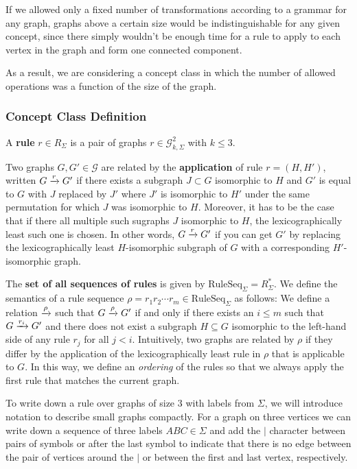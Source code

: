 \documentclass[]{article}
\def\RuleSeq{\mathrm{RuleSeq}\xspace}
\def\Graphs{\mathcal{G}\xspace}
\begin{document}
If we allowed only a fixed number of transformations according to a grammar for
any graph, graphs above a certain size would be indistinguishable for any given
concept, since there simply wouldn't be enough time for a rule to apply to each
vertex in the graph and form one connected component.

As a result, we are considering a concept class in which the number of allowed
operations was a function of the size of the graph.

\subsubsection{Concept Class Definition}

A \textbf{rule} $r \in R_{\Sigma}$ is a pair of graphs
$r \in \Graphs_{k,\Sigma}^2$ with $k \leq 3$.

Two graphs $G,G' \in \Graphs$ are related by the \textbf{application} of rule
$r = (H,H')$, written $G \xrightarrow{r} G'$ if there exists a subgraph $J \subset G$
isomorphic to $H$ and $G'$ is equal to $G$ with $J$ replaced by $J'$ where $J'$
is isomorphic to $H'$ under the same permutation for which $J$ was isomorphic to
$H$. Moreover, it has to be the case that if there all multiple such sugraphs
$J$ isomorphic to $H$, the lexicographically least such one is chosen.
In other words, $G \xrightarrow{r} G'$ if you can get $G'$ by replacing the
lexicographically least $H$-isomorphic subgraph of $G$ with a corresponding
$H'$-isomorphic graph.

The \textbf{set of all sequences of rules} is given by
$\RuleSeq_{\Sigma} = R_{\Sigma}^*$. We define the semantics of a rule sequence
$\rho = r_1r_2\dotsm r_m \in \RuleSeq_{\Sigma}$ as follows: We define a relation
$\xrightarrow{\rho}$ such that $G \xrightarrow{\rho} G'$ if and only if there exists an
$i\leq m$ such that $G\xrightarrow{r_i} G'$ and there does not exist a subgraph
$H \subseteq G$ isomorphic to the left-hand side of any rule $r_j$ for all
$j < i$. Intuitively, two graphs are related by $\rho$ if they differ by the
application of the lexicographically least rule in $\rho$ that is applicable to
$G$. In this way, we define an \emph{ordering} of the rules so that we always apply
the first rule that matches the current graph.

To write down a rule over graphs of size $3$ with labels from $\Sigma$, we will
introduce notation to describe small graphs compactly. For a graph on three
vertices we can write down a sequence of three labels $ABC \in \Sigma$ and add
the $|$ character between pairs of symbols or after the last symbol to indicate
that there is no edge between the pair of vertices around the $|$ or between the
first and last vertex, respectively.
\end{document}

